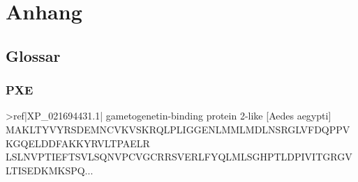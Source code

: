 \documentclass[a4paper]{article}
\newenvironment{fullgrayverb}
{\verbbox}
{\endverbbox\par\colorbox{lightgray}{\parbox{\textwidth}{\theverbbox}}\par}
\begin{document}
\newpage

\section{Anhang}
\subsection{Glossar}

\subsubsection{PXE}

\begin{fullgrayverb}
>ref|XP_021694431.1| gametogenetin-binding protein 2-like [Aedes aegypti]
MAKLTYVYRSDEMNCVKVSKRQLPLIGGENLMMLMDLNSRGLVFDQPPVKGQELDDFAKKYRVLTPAELR
LSLNVPTIEFTSVLSQNVPCVGCRRSVERLFYQLMLSGHPTLDPIVITGRGVLTISEDKMKSPQ...
\end{fullgrayverb}\\
\end{document}
